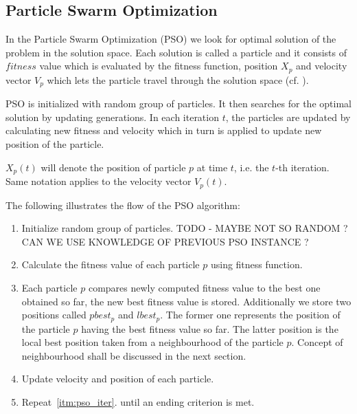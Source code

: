\documentclass[runningheads,a4paper]{llncs}
\begin{document}
\subsection{Particle Swarm Optimization}
In the Particle Swarm Optimization (PSO) we look for optimal solution of the problem in the solution space. Each solution is called a particle and it consists of $fitness$ value which is evaluated by the fitness function, position $X_p$ and velocity vector $V_p$ which lets the particle travel through the solution space (cf. \cite{pso_origin}).

PSO is initialized with random group of particles. It then searches for the optimal solution by updating generations.
In each iteration $t$, the particles are updated by calculating new fitness and velocity which in turn is applied to update new position of the particle.

$X_p(t)$ will denote the position of particle $p$ at time $t$, i.e. the $t$-th iteration. Same notation applies to the velocity vector $V_p(t)$.

The following illustrates the flow of the PSO algorithm:

\begin{center}

\begin{enumerate}
	\item Initialize random group of particles. {\color{red} TODO - MAYBE NOT SO RANDOM ? CAN WE USE KNOWLEDGE OF PREVIOUS PSO INSTANCE ?}
	\item \label{itm:pso_iter} Calculate the fitness value of each particle $p$ using fitness function.
		
	\item Each particle $p$ compares newly computed fitness value to the best one obtained so far, the new best fitness value is stored. Additionally we store two positions called $pbest_p$ and $lbest_p$. The former one represents the position of the particle $p$ having the best fitness value so far. The latter position is the local best position taken from a neighbourhood of the particle $p$. Concept of neighbourhood shall be discussed in the next section.
	
	\item Update velocity and position of each particle.
	
	\item Repeat~\ref{itm:pso_iter}. until an ending criterion is met.
	
\end{enumerate}

\end{center}
\end{document}
